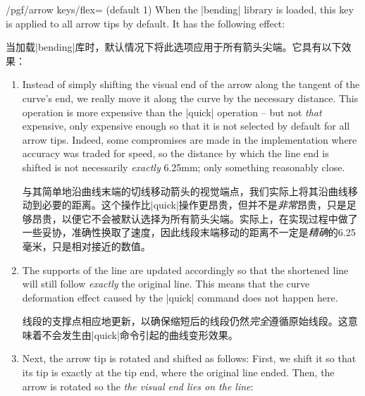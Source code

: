 \begin{key}{/pgf/arrow keys/flex= (default 1)}
    When the |bending| library is loaded, this key is applied to all arrow tips
    by default. It has the following effect:
    

    当加载|bending|库时，默认情况下将此选项应用于所有箭头尖端。它具有以下效果：
    \begin{enumerate}
        \item Instead of simply shifting the visual end of the arrow along
            the tangent of the curve's end, we really move it along the curve
            by the necessary distance. This operation is more expensive than
            the |quick| operation -- but not \emph{that} expensive, only
            expensive enough so that it is not selected by default for all
            arrow tips. Indeed, some compromises are made in the
            implementation where accuracy was traded for speed, so the
            distance by which the line end is shifted is not necessarily
            \emph{exactly} 6.25mm; only something reasonably close.

            
            与其简单地沿曲线末端的切线移动箭头的视觉端点，我们实际上将其沿曲线移动到必要的距离。这个操作比|quick|操作更昂贵，但并不是\emph{非常}昂贵，只是足够昂贵，以便它不会被默认选择为所有箭头尖端。实际上，在实现过程中做了一些妥协，准确性换取了速度，因此线段末端移动的距离不一定是\emph{精确}的6.25毫米，只是相对接近的数值。



        \item The supports of the line are updated accordingly so that the
            shortened line will still follow \emph{exactly} the original
            line. This means that the curve deformation effect caused by the
            |quick| command does not happen here.

            线段的支撑点相应地更新，以确保缩短后的线段仍然\emph{完全}遵循原始线段。这意味着不会发生由|quick|命令引起的曲线变形效果。


        \item Next, the arrow tip is rotated and shifted as follows: First,
            we shift it so that its tip is exactly at the tip end, where the
            original line ended. Then, the arrow is rotated so the \emph{the
            visual end lies on the line}:


\end{enumerate}
\end{key}
